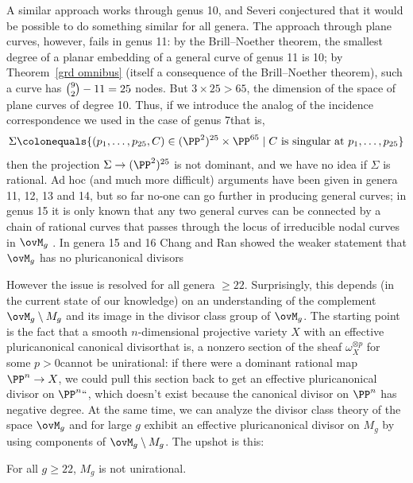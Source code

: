 A similar approach works through genus 10, and Severi conjectured that
%
it would be possible to do something similar for all genera. The
approach through plane curves, however, fails in genus 11: by the
Brill--Noether theorem,
%
the smallest degree of a planar embedding of a general curve of genus
11 is 10; by Theorem~\ref{grd omnibus} (itself a consequence of
the Brill--Noether theorem), such a curve has $\tbinom{9}{2}-11 = 25$
nodes. But $3 \times 25 > 65$, the dimension of the space of plane
curves of degree 10. Thus, if we introduce the analog of the
incidence correspondence
%
we used in the case of genus 7\emdash that is,
$$
\Sigma \colonequals  \{ (p_1,\dots,p_{25},C) \in (\PP^2)^{25} \times \PP^{65} \mid C \text{ is singular at } p_1,\dots,p_{25} \}
$$
then the projection $\Sigma \to (\PP^2)^{25}$ is not dominant, and we have no idea if $\Sigma$ is rational.
Ad hoc (and much more difficult) arguments have been given in genera
11, 12, 13 and 14, but so far no-one can go further in producing
general curves; in genus 15 it is only known that
 any two general curves can be connected by a chain of rational curves that passes through
the locus of irreducible nodal curves in $\ovM_{g}$
\cite{MR2202246}. In genera 15 and 16 Chang and Ran showed
the  weaker statement
that $\ovM_{g}$ has no pluricanonical divisors
{\meshing\par}

However the issue is resolved for all genera $\geq 22$. Surprisingly, this depends (in the current state of our knowledge) on an understanding of the complement
$\ovM_{g}\setminus M_{g}$ and its image in the divisor class group of
$\ovM_{g}$. The starting point is the fact that a smooth
$n$-dimensional projective variety $X$ with an effective
pluricanonical canonical divisor\emdash that is, a nonzero section of
the sheaf $\omega_{X}^{\otimes p}$ for some $p>0$\emdash cannot be
unirational: if there were a
dominant rational map
%
$\PP^n \to X$, we
could pull this section back to get an effective pluricanonical
divisor on $\PP^n` `$, which doesn't exist because
the canonical divisor on $\PP^{n}$ has negative degree. At the same
time, we can analyze the divisor class theory of the space $\ovM_g$
and for large $g$ exhibit an effective pluricanonical divisor on $M_g$
by using components of  $\ovM_{g}\setminus M_{g}$.
The upshot is this:

\begin{npt}
\begin{theorem}
For all $g \geq 22$, $M_g$ is not unirational.
\end{theorem}
\end{npt}

